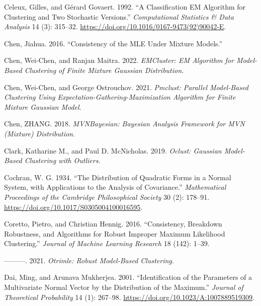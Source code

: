 \begin{CSLReferences}{1}{0}
\leavevmode{}%
Celeux, Gilles, and Gérard Govaert. 1992. {``A Classification {EM} Algorithm for Clustering and Two Stochastic Versions.''} \emph{Computational Statistics \& Data Analysis} 14 (3): 315--32. \url{https://doi.org/10.1016/0167-9473(92)90042-E}.

\leavevmode{}%
Chen, Jiahua. 2016. {``Consistency of the {MLE} Under Mixture Models.''}

\leavevmode{}%
Chen, Wei-Chen, and Ranjan Maitra. 2022. \emph{EMCluster: EM Algorithm for Model-Based Clustering of Finite Mixture Gaussian Distribution}.

\leavevmode{}%
Chen, Wei-Chen, and George Ostrouchov. 2021. \emph{Pmclust: Parallel Model-Based Clustering Using Expectation-Gathering-Maximization Algorithm for Finite Mixture Gaussian Model}.

\leavevmode{}%
Chen, ZHANG. 2018. \emph{MVNBayesian: Bayesian Analysis Framework for MVN (Mixture) Distribution}.

\leavevmode{}%
Clark, Katharine M., and Paul D. McNicholas. 2019. \emph{Oclust: Gaussian Model-Based Clustering with Outliers}.

\leavevmode{}%
Cochran, W. G. 1934. {``The Distribution of Quadratic Forms in a Normal System, with Applications to the Analysis of Covariance.''} \emph{Mathematical Proceedings of the Cambridge Philosophical Society} 30 (2): 178--91. \url{https://doi.org/10.1017/S0305004100016595}.

\leavevmode{}%
Coretto, Pietro, and Christian Hennig. 2016. {``Consistency, Breakdown Robustness, and Algorithms for Robust Improper Maximum Likelihood Clustering.''} \emph{Journal of Machine Learning Research} 18 (142): 1--39.

\leavevmode{}%
---------. 2021. \emph{Otrimle: Robust Model-Based Clustering}.

\leavevmode{}%
Dai, Ming, and Arunava Mukherjea. 2001. {``Identification of the {Parameters} of a {Multivariate Normal Vector} by the {Distribution} of the {Maximum}.''} \emph{Journal of Theoretical Probability} 14 (1): 267--98. \url{https://doi.org/10.1023/A:1007889519309}.


\end{CSLReferences}
